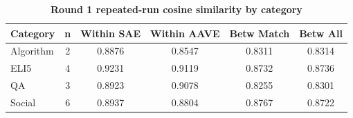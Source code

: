 \begin{table}[htbp]
\centering
\caption{\textbf{Round 1 repeated-run cosine similarity by category}}
\label{tab:round1-repeated-cosine-by-category}
\renewcommand{\arraystretch}{1.4}
\begin{tabular}{|l|c|c|c|c|c|}
\hline
\textbf{Category} & \textbf{n} & \textbf{Within SAE} & \textbf{Within AAVE} & \textbf{Betw Match} & \textbf{Betw All} \\
\hline
Algorithm & 2 & 0.8876 & 0.8547 & 0.8311 & 0.8314 \\
\hline
ELI5 & 4 & 0.9231 & 0.9119 & 0.8732 & 0.8736 \\
\hline
QA & 3 & 0.8923 & 0.9078 & 0.8255 & 0.8301 \\
\hline
Social & 6 & 0.8937 & 0.8804 & 0.8767 & 0.8722 \\
\hline
\end{tabular}
\end{table}
